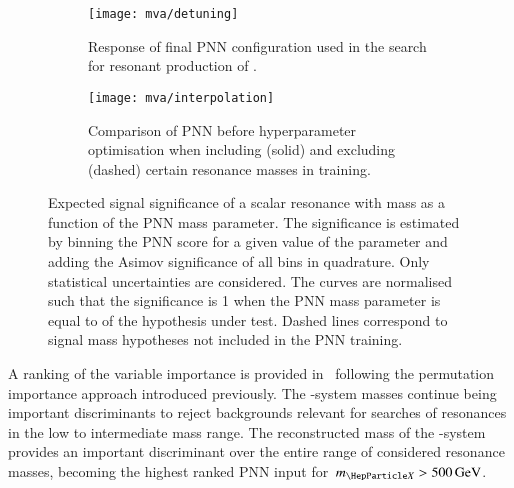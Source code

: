 \begin{figure}[htbp]
  \centering

  \begin{subfigure}[t]{.49\textwidth}
    \texttt{[image: mva/detuning]}
    \caption{Response of final PNN configuration used in the search
      for resonant production of \HH.}
    \label{fig:pnn_detuning}
  \end{subfigure}\hfill%
  \begin{subfigure}[t]{.49\textwidth}
    \centering
    \texttt{[image: mva/interpolation]}
    \caption{Comparison of PNN before hyperparameter optimisation when
      including (solid) and excluding (dashed) certain resonance
      masses in training.}
    \label{fig:pnn_interpolation}
  \end{subfigure}

  \caption{Expected signal significance of a scalar resonance with
    mass \mX as a function of the PNN mass parameter. The significance
    is estimated by binning the PNN score for a given value of the
    parameter and adding the Asimov significance of all bins in
    quadrature. Only statistical uncertainties are considered. The
    curves are normalised such that the significance is 1 when the PNN
    mass parameter is equal to \mX of the hypothesis under
    test. Dashed lines correspond to signal mass hypotheses not
    included in the PNN training.}
  \label{fig:pnn_properties}
\end{figure}

A ranking of the variable importance is provided
in~ following the permutation importance
approach introduced previously. The \PHiggs-system masses continue
being important discriminants to reject backgrounds relevant for
searches of resonances in the low to intermediate mass range. The
reconstructed mass of the \HH-system provides an important
discriminant over the entire range of considered resonance masses,
becoming the highest ranked PNN input for~$\mX > \SI{500}{\GeV}$.

